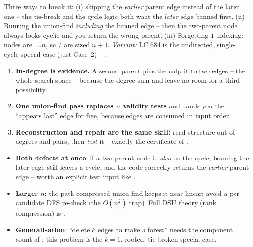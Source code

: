 \begin{warningbox}
Three ways to break it: (i) skipping the \emph{earlier} parent edge instead of the later one -- the
tie-break and the cycle logic both want the \emph{later} edge banned first. (ii) Running the
union-find \emph{including} the banned edge -- then the two-parent node always looks cyclic and you
return the wrong parent. (iii) Forgetting $1$-indexing: nodes are $1..n$, so /
are sized $n+1$. \emph{Variant:} LC 684 is the undirected, single-cycle special case (just
Case~2) -- .
\end{warningbox}

\begin{insightbox}
\begin{enumerate}[nosep, leftmargin=1.6em]
  \item \textbf{In-degree is evidence.} A second parent pins the culprit to two edges -- the whole
        search space -- because the degree sum  and  leave no
        room for a third possibility.
  \item \textbf{One union-find pass replaces $n$ validity tests} and hands you the
        ``appears last'' edge for free, because edges are consumed in input order.
  \item \textbf{Reconstruction and repair are the same skill:} read structure out of degrees and
        pairs, then \emph{test} it -- exactly the certificate of .
\end{enumerate}
\end{insightbox}

\begin{hardeningbox}
\begin{itemize}[nosep, leftmargin=1.4em]
  \item \textbf{Both defects at once}: if a two-parent node is \emph{also} on the cycle, banning the
        later edge still leaves a cycle, and the code correctly returns the \emph{earlier} parent edge
        -- worth an explicit test input like \code{[[2,1],[3,1],[4,2],[1,4]]}.
  \item \textbf{Larger $n$}: the path-compressed union-find keeps it near-linear; avoid a per-candidate
        DFS re-check (the $O(n^2)$ trap). Full DSU theory (rank, compression) is .
  \item \textbf{Generalisation}: ``delete $k$ edges to make a forest'' needs the component count of
        ; this problem is the $k=1$, rooted, tie-broken special case.
\end{itemize}
\end{hardeningbox}

